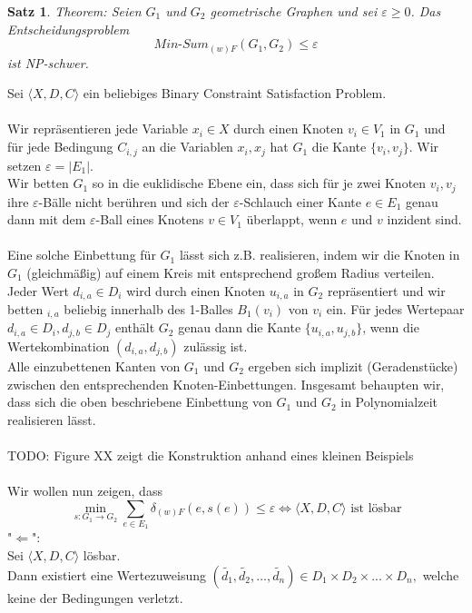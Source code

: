 \documentclass[a4paper, 12pt, twoside]{article}
\theoremstyle{Format1} %
\newtheorem{Satz}[Def]{Satz}                %
\begin{document}
\begin{Satz} \label{Satz NP-Schwerheit}
	Theorem: Seien $G_1$ und $G_2$ geometrische Graphen und sei $\varepsilon \geq 0$.
	Das Entscheidungsproblem $$ \textit{Min-Sum}_{(w)F}(G_1, G_2) \leq  \varepsilon $$ ist NP-schwer.
\end{Satz}

Sei $\langle X,D,C \rangle$ ein beliebiges Binary Constraint Satisfaction Problem.
\\
\\
Wir repräsentieren jede Variable $x_i \in X$ durch einen Knoten $v_i \in V_1$ in $G_1$ und für jede Bedingung $C_{i,j}$ an die Variablen $x_i, x_j$
hat $G_1$ die Kante $\{v_i, v_j\}$. Wir setzen $\varepsilon = |E_1|$.
\\
Wir betten $G_1$ so in die euklidische Ebene ein, dass sich für je zwei Knoten $v_i,v_j$ ihre $\varepsilon$-Bälle nicht berühren und
sich der $\varepsilon$-Schlauch einer Kante $e \in E_1$ genau dann mit dem $\varepsilon$-Ball eines Knotens $v \in V_1$ überlappt, wenn $e$ und $v$ inzident sind.
\\
\\
Eine solche Einbettung für $G_1$ lässt sich z.B. realisieren, indem wir die Knoten in $G_1$ (gleichmäßig) auf einem Kreis mit entsprechend großem Radius verteilen.
\\
Jeder Wert $d_{i,a} \in D_i$ wird durch einen Knoten $u_{i,a}$ in $G_2$ repräsentiert und wir betten $_{i,a}$ beliebig innerhalb des 1-Balles $B_1(v_i)$ von $v_i$ ein.
Für jedes Wertepaar $d_{i,a} \in D_i, d_{j,b} \in D_j$ enthält $G_2$ genau dann die Kante $\{u_{i,a},u_{j,b}\}$, wenn die Wertekombination $(d_{i,a},d_{j,b})$
zulässig ist.
\\
Alle einzubettenen Kanten von $G_1$ und $G_2$ ergeben sich implizit (Geradenstücke) zwischen den entsprechenden Knoten-Einbettungen.
Insgesamt behaupten wir, dass sich die oben beschriebene Einbettung von $G_1$ und $G_2$ in Polynomialzeit realisieren lässt.
\\
\\
TODO: Figure XX zeigt die Konstruktion anhand eines kleinen Beispiels
\\
\\
Wir wollen nun zeigen, dass
$$ \min_{s: G_1 \to G_2} \sum_{e \in E_1} \delta_{(w)F}(e, s(e)) \leq \varepsilon \iff \langle X,D,C \rangle \text{ ist lösbar}$$
"$\Leftarrow$":
\\
Sei $\langle X,D,C \rangle$ lösbar.
\\
Dann existiert eine Wertezuweisung $(\tilde{d_1},\tilde{d_2},...,\tilde{d_n}) \in {D_1 \times D_2 \times ... \times D_n},$ welche keine der Bedingungen verletzt.
\end{document}
